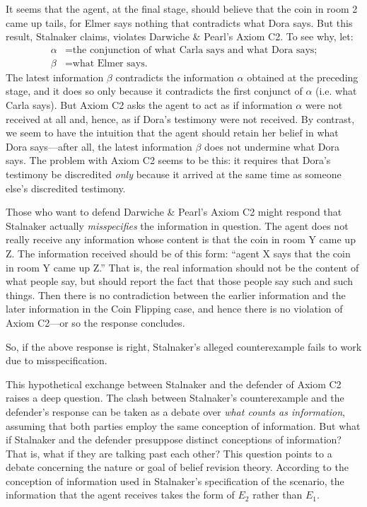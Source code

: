 \ed It seems that the agent, at the final stage, should believe that the coin in room 2 came up tails, for Elmer says nothing that contradicts what Dora says. But this result, Stalnaker claims, violates Darwiche \& Pearl's Axiom C2. To see why, let:
$$
  \begin{aligned}
    \alpha &= \text{the conjunction of what Carla says and what Dora says;}\\
	\beta  &= \text{what Elmer says.}
  \end{aligned}
$$
The latest information $\beta$ contradicts the information $\alpha$ obtained at the preceding stage, and it does so only because it contradicts the first conjunct of $\alpha$ (i.e. what Carla says). But Axiom C2 asks the agent to act as if information $\alpha$ were not received at all and, hence, as if Dora's testimony were not received. By contrast, we seem to have the intuition that the agent should retain her belief in what Dora says---after all, the latest information $\beta$ does not undermine what Dora says. The problem with Axiom C2 seems to be this: it requires that Dora's testimony be discredited {\em only} because it arrived at the same time as someone else's discredited testimony.

Those who want to defend Darwiche \& Pearl's Axiom C2 might respond that Stalnaker actually {\em misspecifies} the information in question. The agent does not really receive any information whose content is that the coin in room Y came up Z. The information received should be of this form: ``agent X says that the coin in room Y came up Z.'' That is, the real information should not be the content of what people say, but should report the fact that those people say such and such things. Then there is no contradiction between the earlier information and the later information in the Coin Flipping case, and hence there is no violation of Axiom C2---or so the response concludes.

So, if the above response is right, Stalnaker's alleged counterexample fails to work due to misspecification. 

This hypothetical exchange between Stalnaker and the defender of Axiom C2 raises a deep question. The clash between Stalnaker's counterexample and the defender's response can be taken as a debate over {\em what counts as information}, assuming that both parties employ the same conception of information. But what if Stalnaker and the defender presuppose distinct conceptions of information? That is, what if they are talking past each other? This question points to a debate concerning the nature or goal of belief revision theory. According to the conception of information used in Stalnaker's specification of the scenario, the information that the agent receives takes the form of $E_2$ rather than $E_1$. \op


